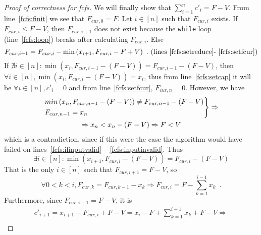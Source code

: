\begin{proof}[Proof of correctness for fcfs]
   We will finally show that $\sum\limits_{i=1}^{n}c'_i = F - V$. From line~\ref{fcfs:finit} we see that $F_{cur,0} = F$.
   Let $i \in [n]$ such that $F_{cur, i}$ exists. If $F_{cur, i} \leq F - V$, then $F_{cur,i+1}$ does not exist because the
   \texttt{while} loop (line~\ref{fcfs:loop}) breaks after calculating $F_{cur,i}$. Else
   \begin{equation*}
      F_{cur,i+1} = F_{cur,i} - \min{\left(x_{i+1}, F_{cur,i} - F + V\right)} \enspace.
      \mbox{ (lines~\ref{fcfs:setreduce}-~\ref{fcfs:setfcur})}
   \end{equation*}
   If $\nexists i \in [n]: \min{\left(x_i, F_{cur, i-1} - \left(F - V\right)\right)} = F_{cur,i-1} - \left(F - V\right)$,
   then $\forall i \in [n], \min{\left(x_i, F_{cur, i} - \left(F - V\right)\right)} = x_i$, thus from line~\ref{fcfs:setcap}
   it will be $\forall i \in [n], c'_i = 0$ and from line~\ref{fcfs:setfcur}, $F_{cur, n} = 0$. However, we have
   \begin{equation*}
   \begin{gathered}
   \begin{rcases}
      min\left(x_n, F_{cur, n-1} - \left(F - V\right)\right) \neq F_{cur, n-1} - \left(F - V\right) \\
      F_{cur, n-1} = x_n
   \end{rcases} \Rightarrow \\
   \Rightarrow x_n < x_n - \left(F - V\right) \Rightarrow F < V
   \end{gathered}
   \end{equation*}
   which is a contradiction, since if this were the case the algorithm would have failed on lines~\ref{fcfs:ifinputvalid}
   -~\ref{fcfs:inputinvalid}. Thus
   \begin{equation*}
      \exists i \in [n]: \min{\left(x_{i+1}, F_{cur, i} - \left(F - V\right)\right)} = F_{cur,i} - \left(F - V\right)
   \end{equation*}
   That is the only $i \in [n]$ such that $F_{cur,i+1} = F - V$, so
   \begin{equation*}
      \forall 0 < k < i, F_{cur,k} = F_{cur,k-1} - x_k \Rightarrow F_{cur,i} = F - \sum\limits_{k=1}^{i-1}x_k \enspace.
   \end{equation*}
   Furthermore, since $F_{cur,i+1} = F - V$, it is
   \begin{equation*}
   \begin{gathered}
      c'_{i+1} = x_{i+1} - F_{cur,i} + F - V = x_i - F + \sum\limits_{k=1}^{i-1}x_k + F - V \Rightarrow \\

\end{gathered}
\end{equation*}
\end{proof}
